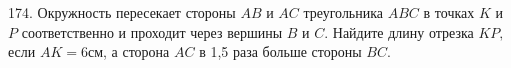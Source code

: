 174. Окружность пересекает стороны $AB$ и $AC$ треугольника $ABC$ в точках $K$ и $P$ соответственно и проходит через вершины $B$ и $C.$ Найдите длину отрезка $KP,$ если $AK=6$см, а сторона $AC$ в 1,5 раза больше стороны $BC.$\\
